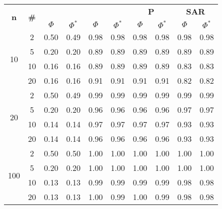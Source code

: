 \begin{table}
\begin{small}
		\bigskip
		\begin{tabular}{|c|c|cc|cc|cc|cc|}
			\hline
			\multirow{2}{*}{\textbf{n}} &
			\multirow{2}{*}{\textbf{\#}} &
			\multicolumn{2}{c|}{\textbf{\astar}} &
			\multicolumn{2}{c|}{\textbf{\ambush}} &
			\multicolumn{2}{c|}{\textbf{P}} &
			\multicolumn{2}{c|}{\textbf{SAR}}\\
			& & $\Phi$ & $\Phi^*$ & $\Phi$ & $\Phi^*$&
			$\Phi$ & $\Phi^*$& $\Phi$ & $\Phi^*$\\
			\hline
			\multirow{4}{*}{10}
			 & 2 & 0.50 & 0.49 & 0.98 & 0.98 & 0.98 & 0.98 & 0.98 & 0.98\\
			 & 5 & 0.20 & 0.20 & 0.89 & 0.89 & 0.89 & 0.89 & 0.89 & 0.89\\
			 & 10 & 0.16 & 0.16 & 0.89 & 0.89 & 0.89 & 0.89 & 0.83 & 0.83\\
			 & 20 & 0.16 & 0.16 & 0.91 & 0.91 & 0.91 & 0.91 & 0.82 & 0.82\\
			\hline
			\multirow{4}{*}{20}
			 & 2 & 0.50 & 0.49 & 0.99 & 0.99 & 0.99 & 0.99 & 0.99 & 0.99\\
			 & 5 & 0.20 & 0.20 & 0.96 & 0.96 & 0.96 & 0.96 & 0.97 & 0.97\\
			 & 10 & 0.14 & 0.14 & 0.97 & 0.97 & 0.97 & 0.97 & 0.93 & 0.93\\
			 & 20 & 0.14 & 0.14 & 0.96 & 0.96 & 0.96 & 0.96 & 0.93 & 0.93\\
			 \hline
			\multirow{4}{*}{100}
			 & 2 & 0.50 & 0.50 & 1.00 & 1.00 & 1.00 & 1.00 & 1.00 & 1.00\\
			 & 5 & 0.20 & 0.20 & 1.00 & 1.00 & 1.00 & 1.00 & 1.00 & 1.00\\
		  	 & 10 & 0.13 & 0.13 & 0.99 & 0.99 & 0.99 & 0.99 & 0.98 & 0.98\\
			 & 20 & 0.13 & 0.13 & 1.00 & 0.99 & 1.00 & 0.99 & 0.98 & 0.98\\
			 \hline
		\end{tabular}
	\end{small}
\end{table}
